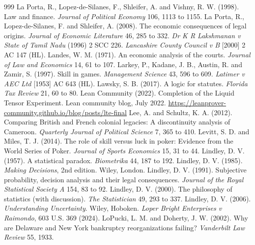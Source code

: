 \begin{thebibliography}{999}
 La Porta, R., Lopez-de-Silanes, F., Shleifer, A. and Vishny, R. W. (1998). Law and finance. \emph{Journal of Political Economy} 106, 1113 to 1155.
 La Porta, R., Lopez-de-Silanes, F. and Shleifer, A. (2008). The economic consequences of legal origins. \emph{Journal of Economic Literature} 46, 285 to 332.
 \emph{Dr K R Lakshmanan v State of Tamil Nadu} (1996) 2 SCC 226.
 \emph{Lancashire County Council v B} [2000] 2 AC 147 (HL).
 Landes, W. M. (1971). An economic analysis of the courts. \emph{Journal of Law and Economics} 14, 61 to 107.
 Larkey, P., Kadane, J. B., Austin, R. and Zamir, S. (1997). Skill in games. \emph{Management Science} 43, 596 to 609.
 \emph{Latimer v AEC Ltd} [1953] AC 643 (HL).
 Lawsky, S. B. (2017). A logic for statutes. \emph{Florida Tax Review} 21, 60 to 80.
 Lean Community (2022). Completion of the Liquid Tensor Experiment. Lean community blog, July 2022. \url{https://leanprover-community.github.io/blog/posts/lte-final}
 Lee, A. and Schultz, K. A. (2012). Comparing British and French colonial legacies: A discontinuity analysis of Cameroon. \emph{Quarterly Journal of Political Science} 7, 365 to 410.
 Levitt, S. D. and Miles, T. J. (2014). The role of skill versus luck in poker: Evidence from the World Series of Poker. \emph{Journal of Sports Economics} 15, 31 to 44.
 Lindley, D. V. (1957). A statistical paradox. \emph{Biometrika} 44, 187 to 192.
 Lindley, D. V. (1985). \emph{Making Decisions}, 2nd edition. Wiley, London.
 Lindley, D. V. (1991). Subjective probability, decision analysis and their legal consequences. \emph{Journal of the Royal Statistical Society A} 154, 83 to 92.
 Lindley, D. V. (2000). The philosophy of statistics (with discussion). \emph{The Statistician} 49, 293 to 337.
 Lindley, D. V. (2006). \emph{Understanding Uncertainty}. Wiley, Hoboken.
 \emph{Loper Bright Enterprises v Raimondo}, 603 U.S. 369 (2024).
 LoPucki, L. M. and Doherty, J. W. (2002). Why are Delaware and New York bankruptcy reorganizations failing? \emph{Vanderbilt Law Review} 55, 1933.

\end{thebibliography}
